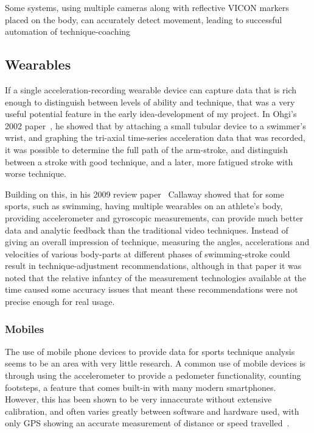 Some systems, using multiple cameras along with reflective VICON markers placed on the body, can accurately detect movement, leading to successful automation of technique-coaching~\cite{automaticrowingcoach}


\subsection{Wearables}
If a single acceleration-recording wearable device can capture data that is rich enough to distinguish between levels of ability and technique, that was a very useful potential feature in the early idea-development of my project.
In Ohgi's 2002 paper~\cite{oghiswim}, he showed that by attaching a small tubular device to a swimmer's wrist, and graphing the tri-axial time-series acceleration data that was recorded, it was possible to determine the full path of the arm-stroke, and distinguish between a stroke with good technique, and a later, more fatigued stroke with worse technique.

Building on this, in his 2009 review paper~\cite{callawayvideoacccomp} Callaway showed that for some sports, such as swimming, having multiple wearables on an athlete's body, providing accelerometer and gyroscopic measurements, can provide much better data and analytic feedback than the traditional video techniques.
Instead of giving an overall impression of technique, measuring the angles, accelerations and velocities of various body-parts at different phases of swimming-stroke could result in technique-adjustment recommendations, although in that paper it was noted that the relative infantcy of the measurement technologies available at the time caused some accuracy issues that meant these recommendations were not precise enough for real usage.

\subsubsection{Mobiles}
The use of mobile phone devices to provide data for sports technique analysis seems to be an area with very little research.
A common use of mobile devices is through using the accelerometer to provide a pedometer functionality, counting footsteps, a feature that comes built-in with many modern smartphones.
However, this has been shown to be very innaccurate without extensive calibration, and often varies greatly between software and hardware used, with only GPS showing an accurate measurement of distance or speed travelled~\cite{pedometer}.

